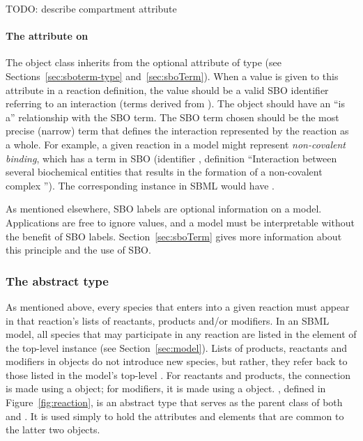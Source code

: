 TODO: describe compartment attribute

\paragraph{The  attribute on }
\label{sec:reaction-sboterm}

The \Reaction object class inherits from \SBase the optional
 attribute of type 
(see Sections~\ref{sec:sboterm-type} and~\ref{sec:sboTerm}).  When
a value is given to this attribute in a reaction
definition, the value should be a valid SBO identifier referring to
an interaction (\ie terms derived from \sbointeraction).  The \Reaction
object should have an ``is a'' relationship with the SBO term.
The SBO term chosen should be the most precise (narrow) term that
defines the interaction represented by the reaction as a whole.  For
example, a given reaction in a model might represent
\emph{non-covalent binding}, which has a term in SBO (identifier
, definition ``Interaction between several
biochemical entities that results in the formation of a
non-covalent complex '').  The corresponding \Reaction instance in
SBML would have .

As mentioned elsewhere, SBO labels are optional
information on a model.  Applications are free to ignore
 values, and a model must be interpretable without
the benefit of SBO labels.  Section~\ref{sec:sboTerm} gives more
information about this principle and the use of SBO.


\subsubsection{The  abstract type}
\label{subsec:simplespeciesreference}

As mentioned above, every species that enters into a given
reaction must appear in that reaction's lists of reactants,
products and/or modifiers.  In an SBML model, all species that may
participate in any reaction are listed in the
 element of the top-level \Model instance
(see Section~\ref{sec:model}).  Lists of products, reactants and
modifiers in \Reaction objects do not introduce new species,
but rather, they refer back to those listed in the model's
top-level .  For reactants and products, the
connection is made using a \SpeciesReference object; for
modifiers, it is made using a \ModifierSpeciesReference 
object.  \SimpleSpeciesReference, defined in
Figure~\vref{fig:reaction}, is an abstract type that serves as the
parent class of both \SpeciesReference and
\ModifierSpeciesReference.  It is used simply to hold the attributes
and elements that are common to the latter two objects.


